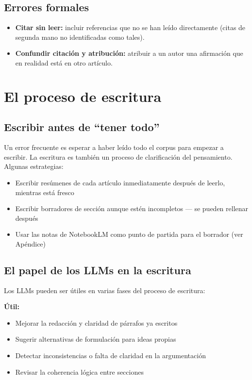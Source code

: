 \documentclass[
]{book}
\providecommand{\tightlist}{%
  \setlength{\itemsep}{0pt}\setlength{\parskip}{0pt}}
\begin{document}
\subsection{Errores formales}\label{errores-formales}

\begin{itemize}
\tightlist
\item
  \textbf{Citar sin leer:} incluir referencias que no se han leído directamente (citas de segunda mano no identificadas como tales).
\item
  \textbf{Confundir citación y atribución:} atribuir a un autor una afirmación que en realidad está en otro artículo.
\end{itemize}

\section{El proceso de escritura}\label{el-proceso-de-escritura}

\subsection{Escribir antes de ``tener todo''}\label{escribir-antes-de-tener-todo}

Un error frecuente es esperar a haber leído todo el corpus para empezar a escribir. La escritura es también un proceso de clarificación del pensamiento. Algunas estrategias:

\begin{itemize}
\tightlist
\item
  Escribir resúmenes de cada artículo inmediatamente después de leerlo, mientras está fresco
\item
  Escribir borradores de sección aunque estén incompletos --- se pueden rellenar después
\item
  Usar las notas de NotebookLM como punto de partida para el borrador (ver Apéndice)
\end{itemize}

\subsection{El papel de los LLMs en la escritura}\label{el-papel-de-los-llms-en-la-escritura}

Los LLMs pueden ser útiles en varias fases del proceso de escritura:

\textbf{Útil:}

\begin{itemize}
\tightlist
\item
  Mejorar la redacción y claridad de párrafos ya escritos
\item
  Sugerir alternativas de formulación para ideas propias
\item
  Detectar inconsistencias o falta de claridad en la argumentación
\item
  Revisar la coherencia lógica entre secciones
\end{itemize}
\end{document}
